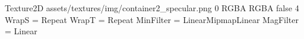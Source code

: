 Texture2D
assets/textures/img/container2_specular.png
0
RGBA
RGBA
false
4
WrapS = Repeat
WrapT = Repeat
MinFilter = LinearMipmapLinear
MagFilter = Linear
